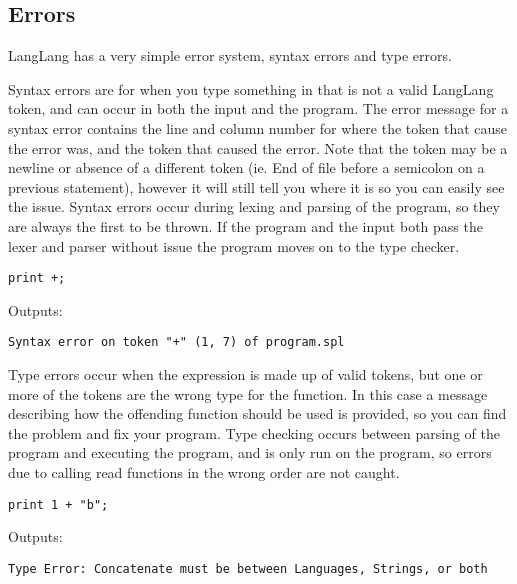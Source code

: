 \subsection{Errors}
\begin{normalsize}
LangLang has a very simple error system, syntax errors and type errors.

Syntax errors are for when you type something in that is not a valid LangLang token, and can occur in both the input and the program. The error message for a syntax error contains the line and column number for where the token that cause the error was, and the token that caused the error. Note that the token may be a newline or absence of a different token (ie. End of file before a semicolon on a previous statement), however it will still tell you where it is so you can easily see the issue. Syntax errors occur during lexing and parsing of the program, so they are always the first to be thrown. If the program and the input both pass the lexer and parser without issue the program moves on to the type checker.

\begin{center}
\begin{minipage}{5cm}
\begin{verbatim}
print +;
\end{verbatim}
\end{minipage}
\end{center}
\begin{normalsize}
Outputs:
\begin{verbatim}
Syntax error on token "+" (1, 7) of program.spl
\end{verbatim}
\end{normalsize}

Type errors occur when the expression is made up of valid tokens, but one or more of the tokens are the wrong type for the function. In this case a message describing how the offending function should be used is provided, so you can find the problem and fix your program. Type checking occurs between parsing of the program and executing the program, and is only run on the program, so errors due to calling read functions in the wrong order are not caught.
\end{normalsize}

\begin{center}
\begin{minipage}{5cm}
\begin{verbatim}
print 1 + "b";
\end{verbatim}
\end{minipage}
\end{center}
\begin{normalsize}
Outputs:
\begin{verbatim}
Type Error: Concatenate must be between Languages, Strings, or both 
\end{verbatim}
\end{normalsize}
